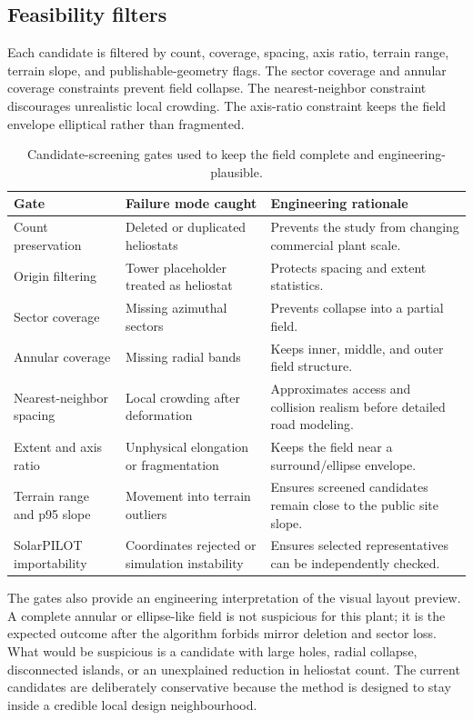 \documentclass[final,3p,times]{elsarticle}
\begin{document}
\subsection{Feasibility filters}
Each candidate is filtered by count, coverage, spacing, axis ratio, terrain range, terrain slope, and publishable-geometry flags. The sector coverage and annular coverage constraints prevent field collapse. The nearest-neighbor constraint discourages unrealistic local crowding. The axis-ratio constraint keeps the field envelope elliptical rather than fragmented.

\begin{table}[t]
\centering
\caption{Candidate-screening gates used to keep the field complete and engineering-plausible.}
\label{tab:gates}
\small
\begin{tabular}{p{}p{}p{}}
\toprule
Gate & Failure mode caught & Engineering rationale \\
\midrule
Count preservation & Deleted or duplicated heliostats & Prevents the study from changing commercial plant scale. \\
Origin filtering & Tower placeholder treated as heliostat & Protects spacing and extent statistics. \\
Sector coverage & Missing azimuthal sectors & Prevents collapse into a partial field. \\
Annular coverage & Missing radial bands & Keeps inner, middle, and outer field structure. \\
Nearest-neighbor spacing & Local crowding after deformation & Approximates access and collision realism before detailed road modeling. \\
Extent and axis ratio & Unphysical elongation or fragmentation & Keeps the field near a surround/ellipse envelope. \\
Terrain range and p95 slope & Movement into terrain outliers & Ensures screened candidates remain close to the public site slope. \\
SolarPILOT importability & Coordinates rejected or simulation instability & Ensures selected representatives can be independently checked. \\
\bottomrule
\end{tabular}
\end{table}

The gates also provide an engineering interpretation of the visual layout preview. A complete annular or ellipse-like field is not suspicious for this plant; it is the expected outcome after the algorithm forbids mirror deletion and sector loss. What would be suspicious is a candidate with large holes, radial collapse, disconnected islands, or an unexplained reduction in heliostat count. The current candidates are deliberately conservative because the method is designed to stay inside a credible local design neighbourhood.
\end{document}

